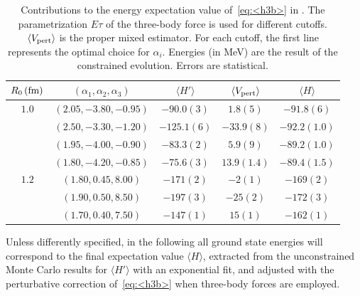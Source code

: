 \documentclass[aps,prc,twocolumn,superscriptaddress,floatfix]{revtex4-1}
\begin{document}
\setlength{\tabcolsep}{1.5pt}
\begin{table}[htb]
\centering
\caption[]{Contributions to the energy expectation value of~\cref{eq:<h3b>} in .
The parametrization $E\tau$ of the three-body force is used for different cutoffs.
$\langle V_{\rm pert}\rangle$ is the proper mixed estimator. 
For each cutoff, the first line represents the optimal choice for $\alpha_i$.
Energies (in MeV) are the result of the constrained evolution.
Errors are statistical.}
\begin{tabular}{ccccc}
\hline\hline
$R_0\,(\rm fm)$ & $(\alpha_1,\alpha_2,\alpha_3)$ & $\langle H'\rangle$ & $\langle V_{\rm pert}\rangle$ & $\langle H\rangle$ \\
\hline
$1.0$ & $(2.05,-3.80,-0.95)$ & $-90.0(3)$  & $1.8(5)$    & $-91.8(6)$   \\
      & $(2.50,-3.30,-1.20)$ & $-125.1(6)$ & $-33.9(8)$  & $-92.2(1.0)$ \\
      & $(1.95,-4.00,-0.90)$ & $-83.3(2)$  & $5.9(9)$    & $-89.2(1.0)$ \\
      & $(1.80,-4.20,-0.85)$ & $-75.6(3)$  & $13.9(1.4)$ & $-89.4(1.5)$ \\
\hline                        
$1.2$ & $(1.80,0.45,8.00)$   & $-171(2)$   & $-2(1)$     & $-169(2)$    \\
      & $(1.90,0.50,8.50)$   & $-197(3)$   & $-25(2)$    & $-172(3)$    \\
      & $(1.70,0.40,7.50)$   & $-147(1)$   & $15(1)$     & $-162(1)$    \\
\hline\hline
\end{tabular}
\label{tab:alpha}
\end{table}
\setlength{\tabcolsep}{10pt}

Unless differently specified, in the following all ground state energies will 
correspond to the final expectation value $\langle H\rangle$, extracted from 
the unconstrained Monte Carlo results for $\langle H'\rangle$ with an exponential fit, 
and adjusted with the perturbative correction of~\cref{eq:<h3b>} when three-body forces are employed.
\end{document}
